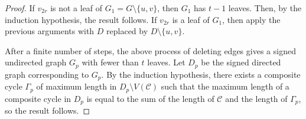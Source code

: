 \documentclass[a4paper, 10pt]{article}
\numberwithin{equation}{section}
\def\dist{{\rm dist}}
\begin{document}
\begin{proof}
	If $v_{2r}$ is not a leaf of $G_1=G\setminus\{u,v\}$, then $G_1$ has $t-1$ leaves. Then, by the induction hypothesis, the result follows.
	If $v_{2r}$ is a leaf of $G_1$, then apply the previous arguments with $D$ replaced by $D\setminus\{u,v\}$.
	
	
	
	
	
	
	
	
	
	
	After a finite number of steps, the above process of deleting edges gives a signed undirected graph $G_p$ with fewer than $t$ leaves. Let $D_p$ be the signed directed graph corresponding to $G_p$. By the induction hypothesis, there exists a composite cycle $\Gamma_p$ of maximum length in $D_p\setminus V(\mathcal{C})$ such that the maximum length of a composite cycle in $D_p$ is equal to the sum of the length of $\mathcal{C}$ and the length of $\Gamma_p$, so the result follows. %
\end{proof}
\end{document}
